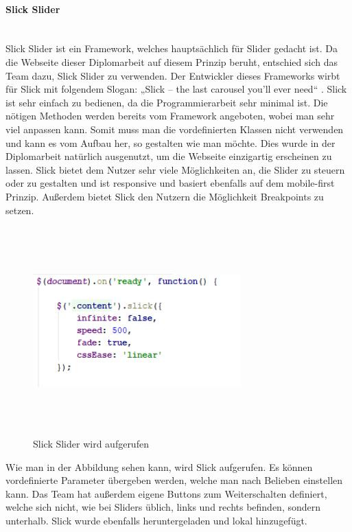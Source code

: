 \paragraph{Slick Slider} \leavevmode \\
Slick Slider ist ein Framework, welches hauptsächlich für Slider gedacht ist. Da die Webseite dieser Diplomarbeit auf diesem Prinzip beruht, entschied sich das Team dazu, Slick Slider zu verwenden. Der Entwickler dieses Frameworks wirbt für Slick mit folgendem Slogan: „Slick – the last carousel you’ll ever need“ . Slick ist sehr einfach zu bedienen, da die Programmierarbeit sehr minimal ist. Die nötigen Methoden werden bereits vom Framework angeboten, wobei man sehr viel anpassen kann. Somit muss man die vordefinierten Klassen nicht verwenden und kann es vom Aufbau her, so gestalten wie man möchte. Dies wurde in der Diplomarbeit natürlich ausgenutzt, um die Webseite einzigartig erscheinen zu lassen. Slick bietet dem Nutzer sehr viele Möglichkeiten an, die Slider zu steuern oder zu gestalten und ist responsive und basiert ebenfalls auf dem mobile-first Prinzip. Außerdem bietet Slick den Nutzern die Möglichkeit Breakpoints zu setzen.
\begin{figure}[H]
	\centering				\includegraphics[width=8cm,height=8cm,keepaspectratio]{webseite_abb1} 
	\caption{Slick Slider wird aufgerufen}
\end{figure}
Wie man in der Abbildung sehen kann, wird Slick aufgerufen. Es können vordefinierte Parameter übergeben werden, welche man nach Belieben einstellen kann. Das Team hat außerdem eigene Buttons zum Weiterschalten definiert, welche sich nicht, wie bei Sliders üblich, links und rechts befinden, sondern unterhalb. Slick wurde ebenfalls heruntergeladen und lokal hinzugefügt.
